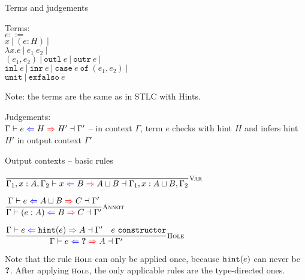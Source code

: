 \documentclass{beamer}
\newcommand{\pipe}{\ |\ }
\newcommand{\annot}[2]{(#1 : #2)}
\newcommand{\fun}[2]{\lambda #1. #2}
\newcommand{\app}[2]{#1\ #2}
\newcommand{\pair}[2]{(#1, #2)}
\newcommand{\outl}[1]{\texttt{outl}\ #1}
\newcommand{\outr}[1]{\texttt{outr}\ #1}
\newcommand{\inl}[1]{\texttt{inl}\ #1}
\newcommand{\inr}[1]{\texttt{inr}\ #1}
\newcommand{\case}[3]{\texttt{case}\ #1\ \texttt{of}\ (#2, #3)}
\newcommand{\unit}{\texttt{unit}}
\newcommand{\exfalso}[1]{\texttt{exfalso}\ #1}
\newcommand{\rulename}[1]{\textsc{\footnotesize{#1}}}
\newcommand{\infrule}[3][]{\displaystyle \frac{#2}{#3} \rulename{#1}}
\newcommand{\sidecond}[1]{#1}
\begin{document}
\begin{frame}{Terms and judgements}

Terms: \\
$e ::=$ \\
\qquad $x \pipe \annot{e}{H} \pipe $ \\
\qquad $\fun{x}{e} \pipe \app{e_1}{e_2} \pipe$ \\
\qquad $\pair{e_1}{e_2} \pipe \outl{e} \pipe \outr{e} \pipe$ \\
\qquad $\inl{e} \pipe \inr{e} \pipe \case{e}{e_1}{e_2} \pipe$ \\
\qquad $\unit \pipe \exfalso{e}$

\vspace{2em}

Note: the terms are the same as in STLC with Hints.

\vspace{2em}

Judgements: \\
$\fulloutctx{\Gamma}{e}{H}{H'}{\Gamma'}$ -- in context $\Gamma$, term $e$ checks with hint $H$ and infers hint $H'$ in output context $\Gamma'$

\end{frame}

\begin{frame}{Output contexts -- basic rules}

\begin{center}
  $\infrule[Var]{}{\fulloutctx{\Gamma_1, x : A, \Gamma_2}{x}{B}{\combinehints{A}{B}}{\Gamma_1, x : \combinehints{A}{B}, \Gamma_2}}$

  \vspace{2em}

  $\infrule[Annot]{\outctx{e}{\combinehints{A}{B}}{C}}{\outctx{\annot{e}{A}}{B}{C}}$

  \vspace{2em}

  $\infrule[Hole]{\outctx{e}{\hintfor{e}}{A} \quad \sidecond{e\ \texttt{constructor}}}{\outctx{e}{\Hole}{A}}$
\end{center}

\vspace{2em}

Note that the rule $\rulename{Hole}$ can only be applied once, because $\texttt{hint}(e)$ can never be $\textbf{?}$. After applying $\rulename{Hole}$, the only applicable rules are the type-directed ones.

\end{frame}
\end{document}
